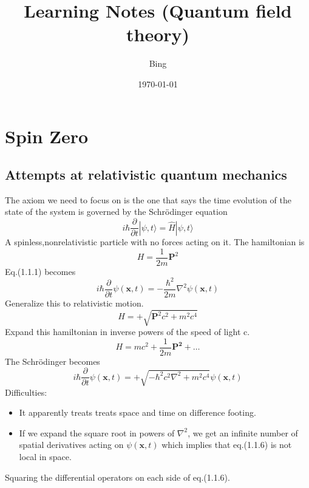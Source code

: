 \documentclass[12pt,a4paper]{article}
\numberwithin{equation}{subsection}
\begin{document}
\title{Learning Notes (Quantum field theory)}
\author{Bing}
\date{\today}
\maketitle

\tableofcontents  %
\newpage

\section{Spin Zero}

\subsection{Attempts at relativistic quantum mechanics}
The axiom we need to focus on is the one that says the time
evolution of the state of the system is governed by the
Schrödinger equation
\begin{equation}
i\hbar\frac{\partial}{\partial t}|\psi,t\rangle =\hat{H}|\psi,t\rangle
\end{equation}
A spinless,nonrelativistic particle with no forces acting on it.
The hamiltonian is
\begin{equation}
H = \frac{1}{2m}\mathbf{P}^2
\end{equation}
Eq.(1.1.1) becomes
\begin{equation}
i\hbar\frac{\partial}{\partial t}\psi(\mathbf{x},t)=-\frac{\hbar^2}{2m}\nabla^2\psi(\mathbf{x},t)
\end{equation}
Generalize this to relativistic motion.
\begin{equation}
H=+\sqrt{\mathbf{P}^2c^2+m^2c^4}
\end{equation}
Expand this hamiltonian in inverse powers of the speed of light c.
\begin{equation}
H=mc^2+\frac{1}{2m}\mathbf{P^2}+\dots
\end{equation}
The Schrödinger becomes
\begin{equation}
i\hbar\frac{\partial}{\partial t}\psi(\mathbf{x},t)=+\sqrt{-\hbar^2c^2\nabla^2+m^2c^4}\psi(\mathbf{x},t)
\end{equation}
Difficulties:
\begin{itemize}
    \item It apparently treats treats space and time on difference footing.
    \item If we expand the square root in powers of $\nabla^2$, we get an infinite number of spatial
derivatives acting on $\psi(\mathbf{x},t)$ which implies that eq.(1.1.6) is not local in space.
\end{itemize}
Squaring the differential operators on each side of eq.(1.1.6).\\
\end{document}
